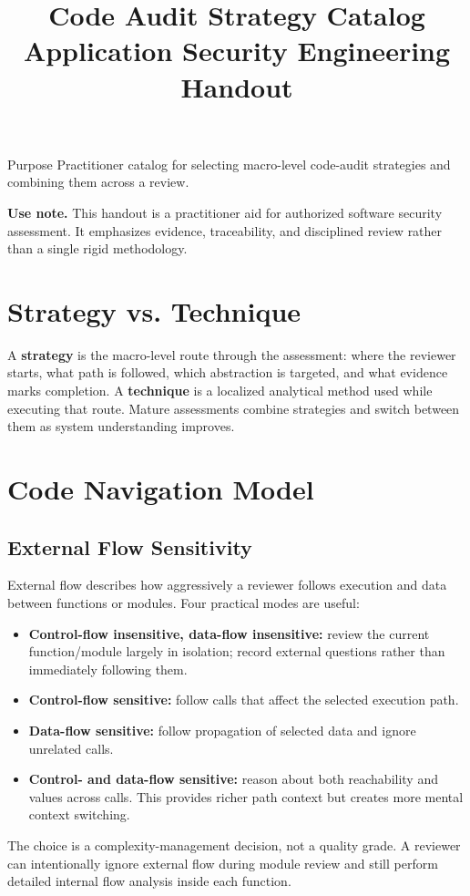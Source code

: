 \documentclass[10pt]{article}
\title{\textbf{Code Audit Strategy Catalog}\\\large Application Security Engineering Handout}
\author{}
\date{}
\begin{document}
\maketitle
\thispagestyle{empty}
\begin{keybox}{Purpose}
Practitioner catalog for selecting macro-level code-audit strategies and combining them across a review.
\end{keybox}
\vfill
\noindent\textbf{Use note.} This handout is a practitioner aid for authorized software security assessment. It emphasizes evidence, traceability, and disciplined review rather than a single rigid methodology.
\newpage
\tableofcontents
\newpage

\section{Strategy vs. Technique}
A \textbf{strategy} is the macro-level route through the assessment: where the reviewer starts, what path is followed, which abstraction is targeted, and what evidence marks completion. A \textbf{technique} is a localized analytical method used while executing that route. Mature assessments combine strategies and switch between them as system understanding improves.

\section{Code Navigation Model}
\subsection{External Flow Sensitivity}
External flow describes how aggressively a reviewer follows execution and data between functions or modules. Four practical modes are useful:
\begin{itemize}
\item \textbf{Control-flow insensitive, data-flow insensitive:} review the current function/module largely in isolation; record external questions rather than immediately following them.
\item \textbf{Control-flow sensitive:} follow calls that affect the selected execution path.
\item \textbf{Data-flow sensitive:} follow propagation of selected data and ignore unrelated calls.
\item \textbf{Control- and data-flow sensitive:} reason about both reachability and values across calls. This provides richer path context but creates more mental context switching.
\end{itemize}
The choice is a complexity-management decision, not a quality grade. A reviewer can intentionally ignore external flow during module review and still perform detailed internal flow analysis inside each function.
\end{document}
